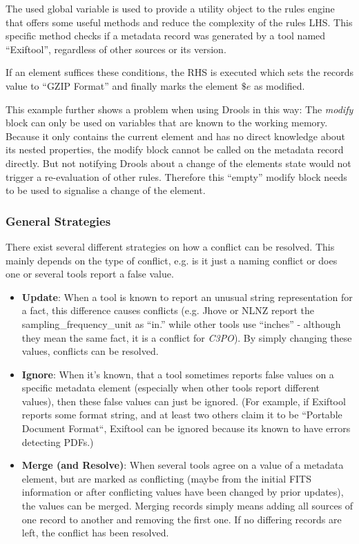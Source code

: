 \documentclass[a4paper,12pt]{article}
\begin{document}
The used global variable is used to provide a utility object to the rules engine that offers some useful methods and reduce the complexity of the rules LHS. This specific method checks if a metadata record was generated by a tool named ``Exiftool'', regardless of other sources or its version.

If an element suffices these conditions, the RHS is executed which sets the records value to ``GZIP Format'' and finally marks the element $\$e$ as modified. 

This example further shows a problem when using Drools in this way: The \emph{modify} block can only be used on variables that are known to the working memory. Because it only contains the current element and has no direct knowledge about its nested properties, the modify block cannot be called on the metadata record directly. But not notifying Drools about a change of the elements state would not trigger a re-evaluation of other rules. Therefore this ``empty'' modify block needs to be used to signalise a change of the element.

\subsubsection{General Strategies}

There exist several different strategies on how a conflict can be resolved. This mainly depends on the type of conflict, e.g. is it just a naming conflict or does one or several tools report a false value.

\begin{itemize}
\item \textbf{Update}: When a tool is known to report an unusual string representation for a fact, this difference causes conflicts (e.g. Jhove or NLNZ report the sampling\_frequency\_unit as ``in.'' while other tools use ``inches'' - although they mean the same fact, it is a conflict for \emph{C3PO}). By simply changing these values, conflicts can be resolved.
\item \textbf{Ignore}: When it's known, that a tool sometimes reports false values on a specific metadata element (especially when other tools report different values), then these false values can just be ignored. (For example, if Exiftool reports some format string, and at least two others claim it to be ``Portable Document Format``, Exiftool can be ignored because its known to have errors detecting PDFs.)
\item \textbf{Merge (and Resolve)}: When several tools agree on a value of a metadata element, but are marked as conflicting (maybe from the initial FITS information or after conflicting values have been changed by prior updates), the values can be merged. Merging records simply means adding all sources of one record to another and removing the first one. If no differing records are left, the conflict has been resolved.

\end{itemize}
\end{document}
